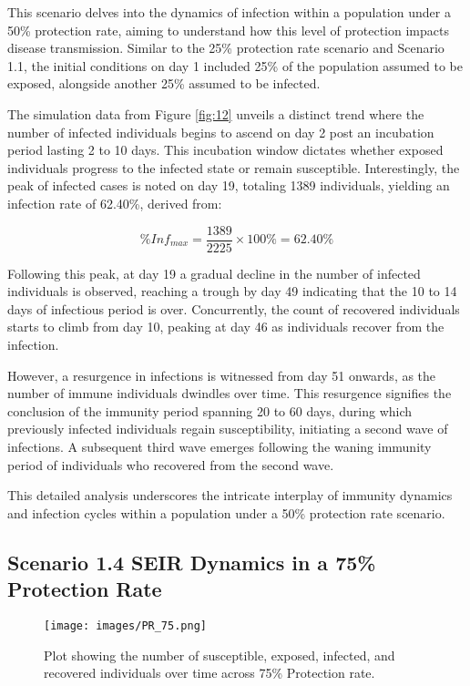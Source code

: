 This scenario delves into the dynamics of infection within a population under a 50\% protection rate, aiming to understand how this level of protection impacts disease transmission. Similar to the 25\% protection rate scenario and Scenario 1.1, the initial conditions on day 1 included 25\% of the population assumed to be exposed, alongside another 25\% assumed to be infected.

The simulation data from Figure \ref{fig:12} unveils a distinct trend where the number of infected individuals begins to ascend on day 2 post an incubation period lasting 2 to 10 days. This incubation window dictates whether exposed individuals progress to the infected state or remain susceptible. Interestingly, the peak of infected cases is noted on day 19, totaling 1389 individuals, yielding an infection rate of 62.40\%, derived from:

\[ \%Inf_{max} = \frac{1389}{2225} \times 100\%  = 62.40\% \]

Following this peak, at day 19 a gradual decline in the number of infected individuals is observed, reaching a trough by day 49 indicating that the 10 to 14 days of infectious period is over. Concurrently, the count of recovered individuals starts to climb from day 10, peaking at day 46 as individuals recover from the infection.

However, a resurgence in infections is witnessed from day 51 onwards, as the number of immune individuals dwindles over time. This resurgence signifies the conclusion of the immunity period spanning 20 to 60 days, during which previously infected individuals regain susceptibility, initiating a second wave of infections. A subsequent third wave emerges following the waning immunity period of individuals who recovered from the second wave.

This detailed analysis underscores the intricate interplay of immunity dynamics and infection cycles within a population under a 50\% protection rate scenario.

\subsection{Scenario 1.4 SEIR Dynamics in a 75\% Protection Rate}
\begin{figure}[H]
	\centering
	\texttt{[image: images/PR\_75.png]}
	\caption{Plot showing the number of susceptible, exposed, infected, and recovered individuals over time across 75\% Protection rate. }
	\label{fig:13S}
\end{figure}


